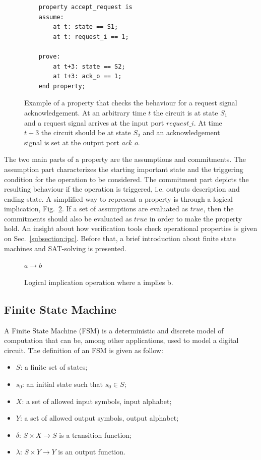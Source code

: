 \begin{figure}[htb!]
    \begin{lstlisting}
    property accept_request is
    assume:
        at t: state == S1;
        at t: request_i == 1;
    
    prove:
        at t+3: state == S2;
        at t+3: ack_o == 1;
    end property;
    \end{lstlisting}
    \caption{Example of a property that checks the behaviour for a request signal acknowledgement. At an arbitrary time $t$ the circuit is at state $S_1$ and a request signal arrives at the input port $request\_i$. At time $t+3$ the circuit should be at state $S_2$ and an acknowledgement signal is set at the output port $ack\_o$.}
    \label{fig:property}
\end{figure}

The two main parts of a property are the assumptions and commitments. The assumption part characterizes the starting important state and the triggering condition for the operation to be considered. The commitment part depicts the resulting behaviour if the operation is triggered, i.e. outputs description and ending state. A simplified way to represent a property is through a logical implication, Fig.~\ref{fig:a_impl_b}. If a set of assumptions are evaluated as $true$, then the commitments should also be evaluated as $true$ in order to make the property hold. An insight about how verification tools check operational properties is given on Sec.~\ref{subsection:ipc}. Before that, a brief introduction about finite state machines and SAT-solving is presented.

\begin{figure}[htb!]
    \begin{center}
        $a \longrightarrow b$
    \end{center}
    \caption{Logical implication operation where a implies b.}
    \label{fig:a_impl_b}
\end{figure}

\subsection*{Finite State Machine}

A Finite State Machine (FSM) is a deterministic and discrete model of computation that can be, among other applications, used to model a digital circuit. The definition of an FSM is given as follow:

\begin{itemize}
    \item[] $S$: a finite set of states;
    \item[] $s_{0}$: an initial state such that  $s_0 \in S$;
    \item[] $X$: a set of allowed input symbols, input alphabet;
    \item[] $Y$: a set of allowed output symbols, output alphabet;
    \item[] $\delta$: $S \times X \to S$ is a transition function;
    \item[] $\lambda$: $S \times Y \to Y$ is an output function.
\end{itemize}

